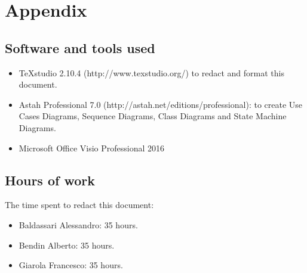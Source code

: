 \documentclass[a4paper,11pt]{report} %
\begin{document}
	\section{Appendix}
	
	\subsection{Software and tools used}
	\begin{itemize}
		\item TeXstudio 2.10.4 (http://www.texstudio.org/) to redact and format this document.
		\item Astah Professional 7.0 (http://astah.net/editions/professional): to create Use
		Cases Diagrams, Sequence Diagrams, Class Diagrams and State Machine	Diagrams.
		\item Microsoft Office Visio Professional 2016
	\end{itemize}
	
	\subsection{Hours of work} The time spent to redact this document:
	\begin{itemize}
		\item Baldassari Alessandro: 35 hours.
		\item Bendin Alberto: 35 hours.
		\item Giarola Francesco: 35 hours.
	\end{itemize}
\end{document}

